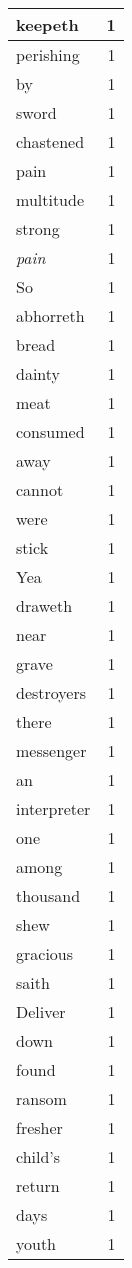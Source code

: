\begin{center}
\begin{longtable}{l|r}
keepeth & 1 \\ \hline
perishing & 1 \\ \hline
by & 1 \\ \hline
sword & 1 \\ \hline
chastened & 1 \\ \hline
pain & 1 \\ \hline
multitude & 1 \\ \hline
strong & 1 \\ \hline
\emph{pain} & 1 \\ \hline
So & 1 \\ \hline
abhorreth & 1 \\ \hline
bread & 1 \\ \hline
dainty & 1 \\ \hline
meat & 1 \\ \hline
consumed & 1 \\ \hline
away & 1 \\ \hline
cannot & 1 \\ \hline
were & 1 \\ \hline
stick & 1 \\ \hline
Yea & 1 \\ \hline
draweth & 1 \\ \hline
near & 1 \\ \hline
grave & 1 \\ \hline
destroyers & 1 \\ \hline
there & 1 \\ \hline
messenger & 1 \\ \hline
an & 1 \\ \hline
interpreter & 1 \\ \hline
one & 1 \\ \hline
among & 1 \\ \hline
thousand & 1 \\ \hline
shew & 1 \\ \hline
gracious & 1 \\ \hline
saith & 1 \\ \hline
Deliver & 1 \\ \hline
down & 1 \\ \hline
found & 1 \\ \hline
ransom & 1 \\ \hline
fresher & 1 \\ \hline
child's & 1 \\ \hline
return & 1 \\ \hline
days & 1 \\ \hline
youth & 1 \\ \hline

\end{longtable}
\end{center}
